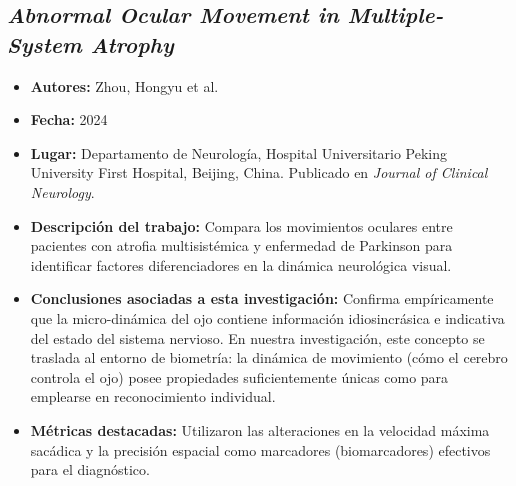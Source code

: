 \subsection{\textit{Abnormal Ocular Movement in Multiple-System Atrophy}}
\begin{itemize}
	\item \textbf{Autores:} Zhou, Hongyu et al. \cite{zhou2024abnormal}
	\item \textbf{Fecha:} 2024
	\item \textbf{Lugar:} Departamento de Neurología, Hospital Universitario Peking University First Hospital, Beijing, China. Publicado en \textit{Journal of Clinical Neurology}.
	\item \textbf{Descripción del trabajo:} Compara los movimientos oculares entre pacientes con atrofia multisistémica y enfermedad de Parkinson para identificar factores diferenciadores en la dinámica neurológica visual.
	\item \textbf{Conclusiones asociadas a esta investigación:} Confirma empíricamente que la micro-dinámica del ojo contiene información idiosincrásica e indicativa del estado del sistema nervioso. En nuestra investigación, este concepto se traslada al entorno de biometría: la dinámica de movimiento (cómo el cerebro controla el ojo) posee propiedades suficientemente únicas como para emplearse en reconocimiento individual.
	\item \textbf{Métricas destacadas:} Utilizaron las alteraciones en la velocidad máxima sacádica y la precisión espacial como marcadores (biomarcadores) efectivos para el diagnóstico.
\end{itemize}

